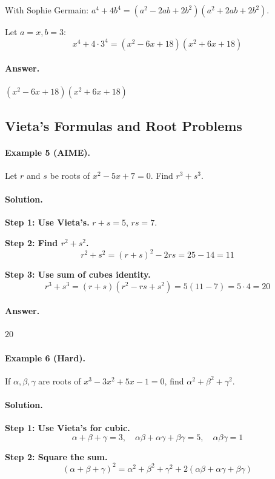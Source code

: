 \documentclass[12pt]{extarticle}
\begin{document}
With Sophie Germain: $a^4 + 4b^4 = (a^2-2ab+2b^2)(a^2+2ab+2b^2)$.

Let $a = x, b = 3$:
\[
x^4 + 4 \cdot 3^4 = (x^2 - 6x + 18)(x^2 + 6x + 18)
\]

\paragraph{Answer.} $\boxed{(x^2-6x+18)(x^2+6x+18)}$

\subsection{Vieta's Formulas and Root Problems}

\paragraph{Example 5 (AIME).} Let $r$ and $s$ be roots of $x^2 - 5x + 7 = 0$. Find $r^3 + s^3$.

\paragraph{Solution.}
\textbf{Step 1: Use Vieta's.} $r+s = 5$, $rs = 7$.

\textbf{Step 2: Find $r^2+s^2$.}
\[
r^2+s^2 = (r+s)^2 - 2rs = 25 - 14 = 11
\]

\textbf{Step 3: Use sum of cubes identity.}
\[
r^3+s^3 = (r+s)(r^2-rs+s^2) = 5(11-7) = 5 \cdot 4 = 20
\]

\paragraph{Answer.} $\boxed{20}$

\paragraph{Example 6 (Hard).} If $\alpha, \beta, \gamma$ are roots of $x^3 - 3x^2 + 5x - 1 = 0$, find $\alpha^2 + \beta^2 + \gamma^2$.

\paragraph{Solution.}
\textbf{Step 1: Use Vieta's for cubic.}
\[
\alpha+\beta+\gamma = 3, \quad \alpha\beta+\alpha\gamma+\beta\gamma = 5, \quad \alpha\beta\gamma = 1
\]

\textbf{Step 2: Square the sum.}
\[
(\alpha+\beta+\gamma)^2 = \alpha^2+\beta^2+\gamma^2 + 2(\alpha\beta+\alpha\gamma+\beta\gamma)
\]
\end{document}
